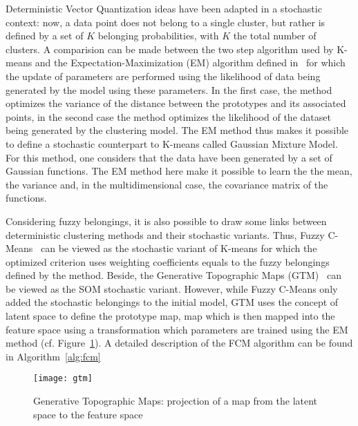     Deterministic Vector Quantization ideas have been adapted in a stochastic context: now, a data point does not belong to a single cluster, but rather is defined by a set of $K$ belonging probabilities, with $K$ the total number of clusters. A comparision can be made between the two step algorithm used by K-means and the Expectation-Maximization (EM) algorithm defined in~\cite{dempster1977maximum} for which the update of parameters are performed using the likelihood of data being generated by the model using these parameters. In the first case, the method optimizes the variance of the distance between the prototypes and its associated points, in the second case the method optimizes the likelihood of the dataset being generated by the clustering model. The EM method thus makes it possible to define a stochastic counterpart to K-means called Gaussian Mixture Model. For this method, one considers that the data have been generated by a set of Gaussian functions. The EM method here make it possible to learn the the mean, the variance and, in the multidimensional case, the covariance matrix of the functions.
    
    Considering fuzzy belongings, it is also possible to draw some links between deterministic clustering methods and their stochastic variants. Thus, Fuzzy C-Means~\cite{bezdek1984fcm} can be viewed as the stochastic variant of K-means for which the optimized criterion uses weighting coefficients equals to the fuzzy belongings defined by the method. Beside, the Generative Topographic Maps (GTM)~\cite{bishop1998gtm} can be viewed as the SOM stochastic variant. However, while Fuzzy C-Means only added the stochastic belongings to the initial model, GTM uses the concept of latent space to define the prototype map, map which is then mapped into the feature space using a transformation which parameters are trained using the EM method (cf. Figure~\ref{fig:gtm}). A detailed description of the FCM algorithm can be found in Algorithm~\ref{alg:fcm}

        \vspace{0.8cm}
   
        \begin{figure}[h]
            \centering
            \texttt{[image: gtm]}
            \caption{Generative Topographic Maps: projection of a map from the latent space to the feature space}
\label{fig:gtm}
        \end{figure}

